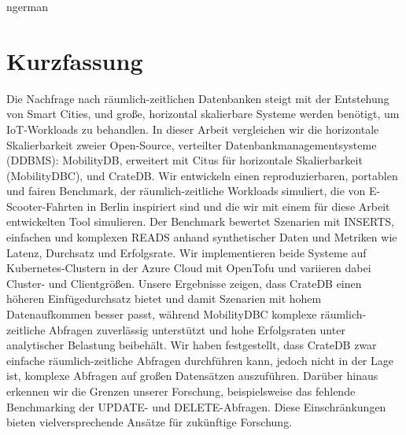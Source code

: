 \documentclass[a4paper, 11pt]{article}
\begin{document}
\clearpage
\begin{otherlanguage}
  {ngerman}
  \section*{Kurzfassung}
  Die Nachfrage nach räumlich-zeitlichen Datenbanken steigt mit der Entstehung von Smart Cities, und große, horizontal skalierbare Systeme werden benötigt, um IoT-Workloads zu behandlen.
  In dieser Arbeit vergleichen wir die horizontale Skalierbarkeit zweier Open-Source, verteilter Datenbankmanagementsysteme (DDBMS): MobilityDB, erweitert mit Citus für horizontale Skalierbarkeit (MobilityDBC), und CrateDB.
  Wir entwickeln einen reproduzierbaren, portablen und fairen Benchmark, der räumlich-zeitliche Workloads simuliert, die von E-Scooter-Fahrten in Berlin inspiriert sind und die wir mit einem für diese Arbeit entwickelten Tool simulieren.
  Der Benchmark bewertet Szenarien mit INSERTS, einfachen und komplexen READS anhand synthetischer Daten und Metriken wie Latenz, Durchsatz und Erfolgsrate.
  Wir implementieren beide Systeme auf Kubernetes-Clustern in der Azure Cloud mit OpenTofu und variieren dabei Cluster- und Clientgrößen.
  Unsere Ergebnisse zeigen, dass CrateDB einen höheren Einfügedurchsatz bietet und damit Szenarien mit hohem Datenaufkommen besser passt, während MobilityDBC komplexe räumlich-zeitliche Abfragen zuverlässig unterstützt und hohe Erfolgsraten unter analytischer Belastung beibehält.
  Wir haben festgestellt, dass CrateDB zwar einfache räumlich-zeitliche Abfragen durchführen kann, jedoch nicht in der Lage ist, komplexe Abfragen auf großen Datensätzen auszuführen.
  Darüber hinaus erkennen wir die Grenzen unserer Forschung, beispielsweise das fehlende Benchmarking der UPDATE- und DELETE-Abfragen.
  Diese Einschränkungen bieten vielversprechende Ansätze für zukünftige Forschung.
\end{otherlanguage}

\clearpage

\tableofcontents


\clearpage

\clearpage

\clearpage

\clearpage

\clearpage

\clearpage


\newpage
\printbibliography
\end{document}
